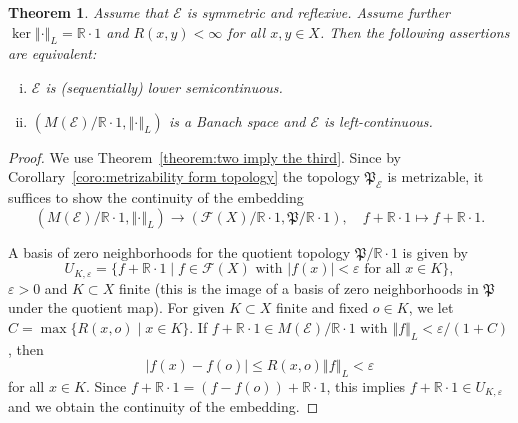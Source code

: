 \documentclass[a4paper,11pt,reqno]{amsart}
\newtheorem{theorem}[lemma]{Theorem}
\theoremstyle{definition}
\numberwithin{equation}{section}
\newcommand{\cE}{{\mathcal E}}
\newcommand{\cF}{{\mathcal F}}
\newcommand{\R}{{\mathbb R}}
\newcommand{\av}[1]{\left\Vert #1\right\Vert}
\newcommand{\1}{\mathds{1}}
\begin{document}
\begin{theorem}\label{theorem:charcterization lower semicontinuity constant kernel}
Assume that $\cE$ is  symmetric and reflexive. Assume further $\ker \av{\cdot}_L = \R \cdot 1$ and $R(x,y) < \infty$ for all $x,y \in X$. Then the following assertions are equivalent:  
 \begin{enumerate}[(i)]
  \item $\cE$ is (sequentially) lower semicontinuous.
  \item $(M(\cE)/\R \cdot 1,\av{\cdot}_L)$ is a Banach space and $\cE$ is left-continuous.
 \end{enumerate}

\end{theorem}
\begin{proof}
We use Theorem~\ref{theorem:two imply the third}. Since by Corollary~\ref{coro:metrizability form topology} the topology $\mathfrak{P}_\cE$ is metrizable, it suffices to show the continuity of the embedding 
%
$$(M(\cE)/ \R \cdot 1, \av{\cdot}_L) \to (\cF(X) / \R \cdot 1, \mathfrak{P}/\R \cdot 1), \quad f + \R \cdot 1 \mapsto  f + \R \cdot 1.$$


A basis of zero neighborhoods for the quotient topology $\mathfrak{P} / \R \cdot 1$ is given by 
%
$$U_{K,\varepsilon} = \{f + \R \cdot 1 \mid f \in \cF(X) \text{ with } |f(x)| < \varepsilon \text{ for all } x\in K\},$$
%
$\varepsilon > 0$ and $K \subset X$ finite (this is the image of a basis of zero neighborhoods in $\mathfrak{P}$ under the quotient map). For given $K \subset X$ finite and fixed $o \in K$, we let $C = \max \{R(x,o) \mid x \in K\}$. If $f + \R \cdot 1 \in M(\cE)/\R \cdot 1$ with $\av{f}_L < \varepsilon/(1 + C)$, then 
%
$$|f(x) - f(o)| \leq R(x,o) \av{f}_L < \varepsilon$$
%
for all $x \in K$. Since $f + \R \cdot 1 = (f - f(o)) + \R \cdot 1$, this implies $f + \R \cdot 1 \in U_{K,\varepsilon}$ and we obtain the continuity of the embedding.  
\end{proof}
\end{document}
